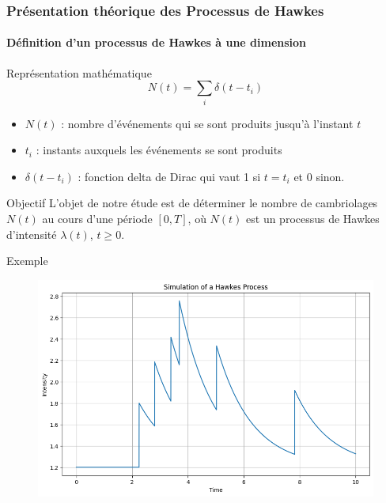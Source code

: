 \begin{frame}
    \frametitle{Présentation théorique des Processus de Hawkes}
    \framesubtitle{Définition d'un processus de Hawkes à une dimension}

    \begin{block}{Représentation mathématique}
        \[ N(t) = \sum_i \delta(t - t_i) \]

        \begin{itemize}
            \item $N(t)$ : nombre d'événements qui se sont produits jusqu'à l'instant $t$
            \item $t_i$ : instants auxquels les événements se sont produits
            \item $\delta(t - t_i)$ : fonction delta de Dirac qui vaut 1 si $t = t_i$ et 0 sinon.
        \end{itemize}
    \end{block}

\end{frame}


\begin{frame}

\begin{alertblock}{Objectif}
		L'objet de notre étude est de déterminer le nombre de cambriolages $N(t)$ au cours d'une période $[0, T]$, où $N(t)$ est un processus de Hawkes d'intensité $\lambda(t)$, $t \geq 0$.
	\end{alertblock}

\begin{block}{Exemple}
\begin{figure}[h!]
\centering
\includegraphics[width=0.6\linewidth]{figures/hawkes_process.png}
\label{fig:hawkes_process}
\end{figure}
\end{block}
\end{frame}



